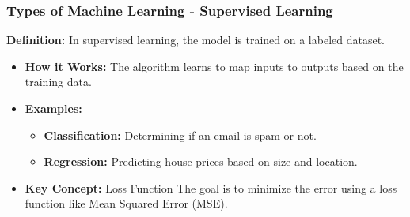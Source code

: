 \documentclass[aspectratio=169]{beamer}
\begin{document}
\begin{frame}[fragile]
    \frametitle{Types of Machine Learning - Supervised Learning}
    \textbf{Definition:} In supervised learning, the model is trained on a labeled dataset.
    
    \begin{itemize}
        \item \textbf{How it Works:} 
        The algorithm learns to map inputs to outputs based on the training data.
        
        \item \textbf{Examples:}
        \begin{itemize}
            \item \textbf{Classification:} Determining if an email is spam or not.
            \item \textbf{Regression:} Predicting house prices based on size and location.
        \end{itemize}
        
        \item \textbf{Key Concept:} Loss Function
        The goal is to minimize the error using a loss function like Mean Squared Error (MSE).
    \end{itemize}
\end{frame}
\end{document}
